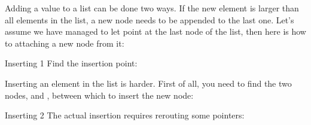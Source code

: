 Adding a value to a list can be done two ways. If the new element is
larger than all elements in the list, a new node needs to be appended
to the last one. Let's assume we have managed
to let  point at the last node of the list,
then here is how to 
attaching a new node from it:
%

\begin{block}{Inserting 1}
  \label{sl:flink5}
  Find the insertion point:
\end{block}

Inserting an element in the list is harder.
First of all, you need to find the two nodes,
 and , between which to insert the new node:
%

\begin{block}{Inserting 2}
  \label{sl:flink6}
  The actual insertion requires rerouting some pointers:
\end{block}
